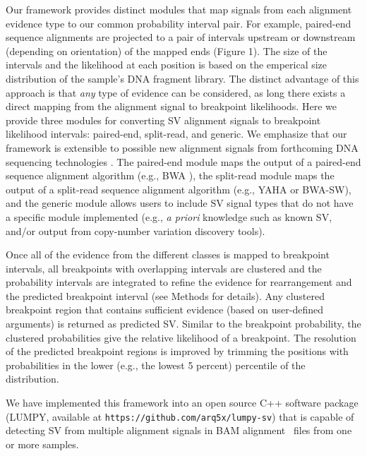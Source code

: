 \documentclass[10pt]{bmc_article}
\def\texttt{[image: ]}
\newenvironment{bmcformat}{\begin{raggedright}\baselineskip20pt\sloppy\setboolean{publ}{false}}{\end{raggedright}\baselineskip20pt\sloppy}
\begin{document}
\begin{bmcformat}
Our framework provides distinct modules that map signals from each alignment
evidence type to our common probability interval pair.  For example, paired-end
sequence alignments are projected to a pair of intervals upstream or downstream
(depending on orientation) of the mapped ends (Figure 1).  The size of the
intervals and the likelihood at each position is based on the emperical size
distribution of the sample's DNA fragment library.  The distinct advantage of
this approach is that \emph{any} type of evidence can be considered, as long
there exists a direct mapping from the alignment signal to breakpoint
likelihoods.  Here we provide three modules for converting SV alignment signals
to breakpoint likelihood intervals: paired-end, split-read, and generic.  We
emphasize that our framework is extensible to possible new alignment signals
from forthcoming DNA sequencing technologies \cite{clarke2009}. The paired-end
module maps the output of a paired-end sequence alignment algorithm
(e.g., BWA \cite{li2009a}), the split-read module maps the output of a
split-read sequence alignment algorithm (e.g., YAHA\cite{faust2012} or
BWA-SW\cite{li2010}), and the generic module allows users to include
SV signal types that do not have a specific module implemented (e.g.,
\emph{a priori} knowledge such as known SV, and/or output from
copy-number variation discovery tools).

Once all of the evidence from the different classes is mapped to breakpoint
intervals, all breakpoints with overlapping intervals are clustered and
the probability intervals are integrated to refine the evidence for
rearrangement and the predicted breakpoint interval (see Methods for details). 
Any clustered breakpoint region that contains sufficient evidence (based on
user-defined arguments) is returned as predicted SV. 
Similar to the breakpoint probability, the clustered probabilities give the
relative likelihood of a breakpoint.  The resolution of the predicted breakpoint
regions is improved by trimming the positions with probabilities
in the lower (e.g., the lowest 5 percent) percentile of the distribution.

We have implemented this framework into an open source C++ software package
(LUMPY, available at {\tt https://github.com/arq5x/lumpy-sv})
that is capable of detecting SV from multiple alignment signals in BAM
alignment~\cite{li2009b} files from one or more samples. 



\end{bmcformat}
\end{document}
